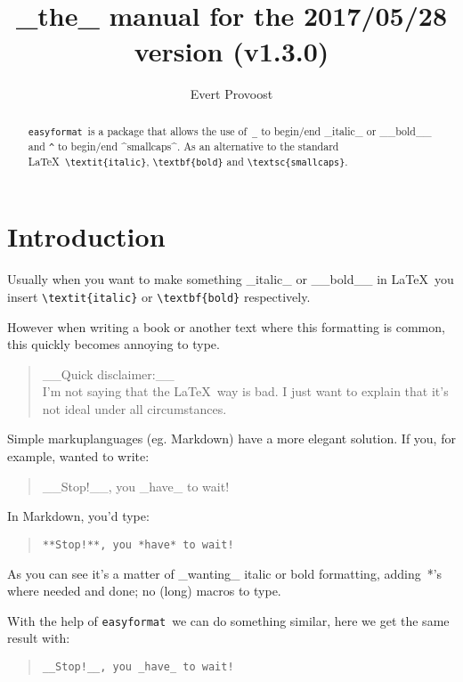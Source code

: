 \documentclass[a4paper, 11pt]{article}
\title{\easyformat\\[.5em]
		\large _the_ manual for the 2017/05/28 version (v1.3.0)}
\author{Evert Provoost}
\date{}
\def\easyformat{\texttt{easyformat}}
\begin{document}
	\maketitle
	
	\begin{abstract}
		\easyformat\ is a package that allows the use of~\verb|_| to begin/end _italic_ or __bold__ and \verb|^| to begin/end ^smallcaps^. As an alternative to the standard \LaTeX\ \verb|\textit{italic}|, \verb|\textbf{bold}| and \verb|\textsc{smallcaps}|.
	\end{abstract}

	\tableofcontents
	\newpage
	
	
	\section{Introduction}
	Usually when you want to make something _italic_ or __bold__ in \LaTeX\ you insert \verb|\textit{italic}| or \verb|\textbf{bold}| respectively.
	
	However when writing a book or another text where this formatting is common, this quickly becomes annoying to type.

	\begin{quote}
	__Quick disclaimer:__\\
	I'm not saying that the \LaTeX\ way is bad. I just want to explain that it's not ideal under all circumstances.
	\end{quote}
	
	Simple markuplanguages (eg. Markdown) have a more elegant solution.	
	If you, for example, wanted to write:
	\begin{quote}
		__Stop!__, you _have_ to wait!
	\end{quote}

	In Markdown, you'd type:
	\begin{quote}
		\verb|**Stop!**, you *have* to wait!|
	\end{quote}

	As you can see it's a matter of _wanting_ italic or bold formatting, adding~*'s where needed and done; no (long) macros to type.
	
	With the help of \easyformat\ we can do something similar, here we get the same result with:
	\begin{quote}
		\verb|__Stop!__, you _have_ to wait!|
	\end{quote}
	
\end{document}
